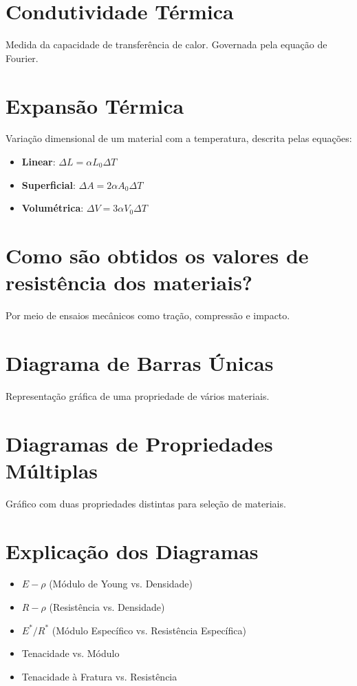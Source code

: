 \section{Condutividade Térmica}
Medida da capacidade de transferência de calor. Governada pela equação de Fourier.

\section{Expansão Térmica}
Variação dimensional de um material com a temperatura, descrita pelas equações:

\begin{itemize}
    \item \textbf{Linear}: \( \Delta L = \alpha L_0 \Delta T \)
    \item \textbf{Superficial}: \( \Delta A = 2\alpha A_0 \Delta T \)
    \item \textbf{Volumétrica}: \( \Delta V = 3\alpha V_0 \Delta T \)
\end{itemize}

\section{Como são obtidos os valores de resistência dos materiais?}
Por meio de ensaios mecânicos como tração, compressão e impacto.

\section{Diagrama de Barras Únicas}
Representação gráfica de uma propriedade de vários materiais.

\section{Diagramas de Propriedades Múltiplas}
Gráfico com duas propriedades distintas para seleção de materiais.

\section{Explicação dos Diagramas}
\begin{itemize}
    \item \( E-\rho \) (Módulo de Young vs. Densidade)
    \item \( R-\rho \) (Resistência vs. Densidade)
    \item \( E^*/R^* \) (Módulo Específico vs. Resistência Específica)
    \item Tenacidade vs. Módulo
    \item Tenacidade à Fratura vs. Resistência
\end{itemize}

